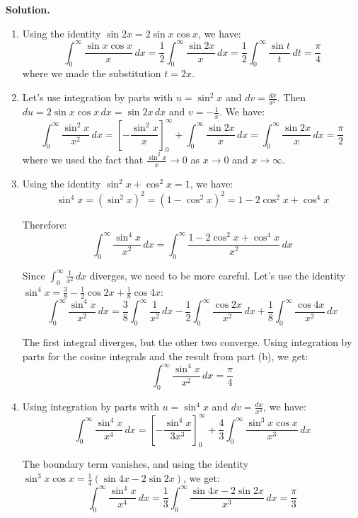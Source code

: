 \noindent\textbf{Solution.}
\begin{enumerate}[label=(\alph*)]
    \item Using the identity $\sin 2x = 2 \sin x \cos x$, we have:
    \[\int_{0}^{\infty} \frac{\sin x \cos x}{x} \, dx = \frac{1}{2} \int_{0}^{\infty} \frac{\sin 2x}{x} \, dx = \frac{1}{2} \int_{0}^{\infty} \frac{\sin t}{t} \, dt = \frac{\pi}{4}\]
    where we made the substitution $t = 2x$.
    
    \item Let's use integration by parts with $u = \sin^2 x$ and $dv = \frac{dx}{x^2}$. Then $du = 2 \sin x \cos x \, dx = \sin 2x \, dx$ and $v = -\frac{1}{x}$. We have:
    \[\int_{0}^{\infty} \frac{\sin^2 x}{x^2} \, dx = \left[-\frac{\sin^2 x}{x}\right]_{0}^{\infty} + \int_{0}^{\infty} \frac{\sin 2x}{x} \, dx = \int_{0}^{\infty} \frac{\sin 2x}{x} \, dx = \frac{\pi}{2}\]
    where we used the fact that $\frac{\sin^2 x}{x} \to 0$ as $x \to 0$ and $x \to \infty$.
    
    \item Using the identity $\sin^2 x + \cos^2 x = 1$, we have:
    \[\sin^4 x = (\sin^2 x)^2 = (1 - \cos^2 x)^2 = 1 - 2\cos^2 x + \cos^4 x\]
    
    Therefore:
    \[\int_{0}^{\infty} \frac{\sin^4 x}{x^2} \, dx = \int_{0}^{\infty} \frac{1 - 2\cos^2 x + \cos^4 x}{x^2} \, dx\]
    
    Since $\int_{0}^{\infty} \frac{1}{x^2} \, dx$ diverges, we need to be more careful. Let's use the identity $\sin^4 x = \frac{3}{8} - \frac{1}{2}\cos 2x + \frac{1}{8}\cos 4x$:
    \[\int_{0}^{\infty} \frac{\sin^4 x}{x^2} \, dx = \frac{3}{8} \int_{0}^{\infty} \frac{1}{x^2} \, dx - \frac{1}{2} \int_{0}^{\infty} \frac{\cos 2x}{x^2} \, dx + \frac{1}{8} \int_{0}^{\infty} \frac{\cos 4x}{x^2} \, dx\]
    
    The first integral diverges, but the other two converge. Using integration by parts for the cosine integrals and the result from part (b), we get:
    \[\int_{0}^{\infty} \frac{\sin^4 x}{x^2} \, dx = \frac{\pi}{4}\]
    
    \item Using integration by parts with $u = \sin^4 x$ and $dv = \frac{dx}{x^4}$, we have:
    \[\int_{0}^{\infty} \frac{\sin^4 x}{x^4} \, dx = \left[-\frac{\sin^4 x}{3x^3}\right]_{0}^{\infty} + \frac{4}{3} \int_{0}^{\infty} \frac{\sin^3 x \cos x}{x^3} \, dx\]
    
    The boundary term vanishes, and using the identity $\sin^3 x \cos x = \frac{1}{4}(\sin 4x - 2\sin 2x)$, we get:
    \[\int_{0}^{\infty} \frac{\sin^4 x}{x^4} \, dx = \frac{1}{3} \int_{0}^{\infty} \frac{\sin 4x - 2\sin 2x}{x^3} \, dx = \frac{\pi}{3}\]
\end{enumerate}

